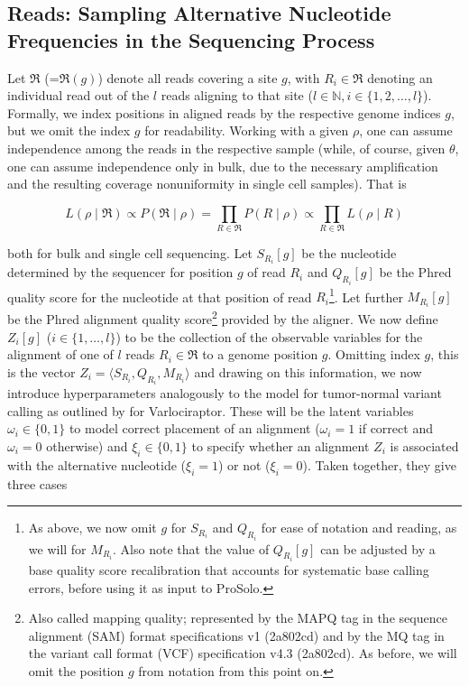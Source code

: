 \documentclass[authoryear,preprint,11pt]{scrartcl}
\newcommand{\Prob}{{P}}
\newcommand{\cR}{{\mathfrak R}}
\begin{document}
\subsection{Reads: Sampling Alternative Nucleotide Frequencies in the Sequencing Process}
\label{sec.reads}

Let $\cR$ (=$\cR(g)$) denote all reads covering a site $g$, with $R_i\in\cR$ denoting an individual read out of the $l$ reads aligning to that site (${l\in{\mathbb N}, i \in \{1,2,\dots,l\}}$).
Formally, we index positions in aligned reads by the respective genome indices $g$, but we omit the index $g$ for readability.
Working with a given $\rho$, one can assume independence among the reads in the respective sample (while, of course, given $\theta$, one can assume independence only in bulk, due to the necessary amplification and the resulting coverage nonuniformity in single cell samples).
That is

\begin{equation}
 \label{eq.independence}
 L(\rho\mid\cR) \propto \Prob(\cR\mid\rho) = \prod_{R\in\cR}\Prob(R\mid\rho) \propto \prod_{R\in\cR}L(\rho\mid R)
\end{equation}

both for bulk and single cell sequencing. 
Let $S_{R_i}[g]$ be the nucleotide determined by the sequencer for position $g$ of read $R_i$ and $Q_{R_i}[g]$ be the Phred quality score for the nucleotide at that position of read $R_i$\footnote{
 As above, we now omit $g$ for $S_{R_i}$ and $Q_{R_i}$ for ease of notation and reading, as we will for $M_{R_i}$.
 Also note that the value of $Q_{R_i}[g]$ can be adjusted by a base quality score recalibration that accounts for systematic base calling errors, before using it as input to ProSolo.
}.
Let further $M_{R_i}[g]$ be the Phred alignment quality score\footnote{
 Also called mapping quality; represented by the MAPQ tag in the sequence alignment (SAM) format specifications v1 (2a802cd) and by the MQ tag in the variant call format (VCF) specification v4.3 (2a802cd).
 As before, we will omit the position $g$ from notation from this point on.
} provided by the aligner.
We now define $Z_i[g]$ ($i\in\{1,\dots,l\}$) to be the collection of the observable variables for the alignment of one of $l$ reads $R_i \in \cR$ to a genome position $g$.
Omitting index $g$, this is the vector ${Z_i = \langle S_{R_i}, Q_{R_i}, M_{R_i} \rangle}$ and drawing on this information, we now introduce hyperparameters analogously to the model for tumor-normal variant calling as outlined by \cite{koster_varlociraptor_2020} for Varlociraptor.
These will be the latent variables $\omega_i\in\{0,1\}$ to model correct placement of an alignment ($\omega_i=1$ if correct and $\omega_i=0$ otherwise) and $\xi_i\in\{0,1\}$ to specify whether an alignment $Z_i$ is associated with the alternative nucleotide ($\xi_i=1$) or not ($\xi_i=0$).
Taken together, they give three cases
\end{document}
